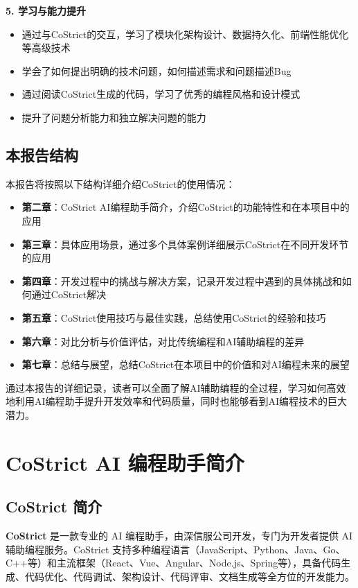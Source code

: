 \documentclass[12pt,a4paper]{article}
\begin{document}
\textbf{5. 学习与能力提升}
\begin{itemize}
    \item 通过与CoStrict的交互，学习了模块化架构设计、数据持久化、前端性能优化等高级技术
    \item 学会了如何提出明确的技术问题，如何描述需求和问题描述Bug
    \item 通过阅读CoStrict生成的代码，学习了优秀的编程风格和设计模式
    \item 提升了问题分析能力和独立解决问题的能力
\end{itemize}

\subsection{本报告结构}

本报告将按照以下结构详细介绍CoStrict的使用情况：

\begin{itemize}
    \item \textbf{第二章}：CoStrict AI编程助手简介，介绍CoStrict的功能特性和在本项目中的应用
    \item \textbf{第三章}：具体应用场景，通过多个具体案例详细展示CoStrict在不同开发环节的应用
    \item \textbf{第四章}：开发过程中的挑战与解决方案，记录开发过程中遇到的具体挑战和如何通过CoStrict解决
    \item \textbf{第五章}：CoStrict使用技巧与最佳实践，总结使用CoStrict的经验和技巧
    \item \textbf{第六章}：对比分析与价值评估，对比传统编程和AI辅助编程的差异
    \item \textbf{第七章}：总结与展望，总结CoStrict在本项目中的价值和对AI编程未来的展望
\end{itemize}

通过本报告的详细记录，读者可以全面了解AI辅助编程的全过程，学习如何高效地利用AI编程助手提升开发效率和代码质量，同时也能够看到AI编程技术的巨大潜力。

\section{CoStrict AI 编程助手简介}

\subsection{CoStrict 简介}

\textbf{CoStrict} 是一款专业的 AI 编程助手，由深信服公司开发，专门为开发者提供 AI 辅助编程服务。CoStrict 支持多种编程语言（JavaScript、Python、Java、Go、C++等）和主流框架（React、Vue、Angular、Node.js、Spring等），具备代码生成、代码优化、代码调试、架构设计、代码评审、文档生成等全方位的开发能力。
\end{document}

